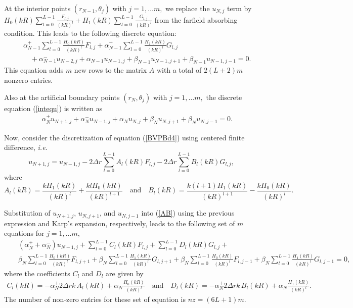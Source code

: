 \documentclass[final,3p,times,12pt]{elsarticle}
\begin{document}
At the interior points $(r_{N-1},\theta_j)$ with $j=1,\dots m,$ we replace the 
$u_{N,j}$ term by $H_0(kR) \sum_{l=0}^{L-1} \frac{F_{l,j}}{(kR)^l} + H_1(kR)\sum_{l=0}^{L-1} \frac{G_{l,j}}{(kR)^l}$ from the farfield absorbing condition.  This leads to the following discrete equation:
\begin{eqnarray}
&&\alpha_{N-1}^{+}\sum_{l=0}^{L-1}\frac{H_0(kR)}{(kR)^l}  F_{l,j} + \alpha_{N-1}^{+}\sum_{l=0}^{L-1}\frac{H_1(kR)}{(kR)^l}  G_{l,j}\nonumber\\
 &&\quad+ \alpha_{N-1}^{-}u_{N-2,j} + \alpha_{N-1}u_{N-1,j}+ \beta_{N-1}u_{N-1,j+1} + \beta_{N-1}u_{N-1,j-1}=0.\label{interioreq}
\end{eqnarray}
This equation adds $ m$ new rows to the matrix $A$ with a total of $2(L+2)m$ nonzero entries.

Also at the artificial boundary points $(r_{N},\theta_j)$ with $j=1,\dots m,$ the discrete equation  (\ref{intequ}) is written as
 \begin{eqnarray}
&&\alpha_N^{+} u_{N+1,j}+ \alpha_N^{-} u_{N-1,j} + \alpha_N u_{N,j}+ \beta_{N} u_{N,j+1}+ \beta_N u_{N,j-1} =0.
\label{AB}
\end{eqnarray}

Now, consider the discretization of equation (\ref{BVPBd4}) using centered finite difference, {\it i.e.}
\begin{equation}
u_{N+1,j} = u_{N-1,j}  
-2\Delta r \sum_{l=0}^{L-1}A_l(kR)F_{l,j} - 
2\Delta r \sum_{l=0}^{L-1}B_l(kR)G_{l,j}, \label{1deriv}
\end{equation}
where 
\begin{equation}
A_l(kR)=\frac{kH_1(kR)}{(kR)^l} + \frac{klH_0(kR)}{(kR)^{l+1}}\quad\mbox{and}\quad 
B_l(kR)=\frac{k(l+1)H_1(kR)}{(kR)^{l+1}} - \frac{kH_0(kR)}{(kR)^{l}}. \nonumber
\end{equation}

Substitution of $u_{N+1,j}$, $u_{N,j+1}$, and $u_{N,j-1}$ into (\ref{AB}) using the previous expression and Karp's expansion, respectively, leads to the following set of $m$ equations for $j=1,\dots m$,
\begin{eqnarray}
&&(\alpha_N^{+} +\alpha_N^{-} )u_{N-1,j}  + \sum_{l=0}^{L-1}C_l(kR) F_{l,j} +\sum_{l=0}^{L-1}D_l(kR) G_{l,j}+ \label{uneq}\\
&&\beta_{N}\sum_{l=0}^{L-1}\frac{H_0(kR)}{(kR)^l}  F_{l,j+1} + \beta_{N}\sum_{l=0}^{L-1}\frac{H_1(kR)}{(kR)^l}  G_{l,j+1}
+ \beta_{N}\sum_{l=0}^{L-1}\frac{H_0(kR)}{(kR)^l}  F_{l,j-1} + \beta_{N}\sum_{l=0}^{L-1}\frac{H_1(kR)}{(kR)^l}  G_{l,j-1}=0,
\nonumber
\end{eqnarray}
where the coefficients $C_l$ and $D_l$ are given by
\begin{eqnarray}
C_l(kR) =  -\alpha_N^{+}2\Delta r k \,A_l(kR)
 + \alpha_N \frac{H_0(kR)}{(kR)^l} \quad \mbox{and}\quad
D_l(kR) =  -\alpha_N^{+} 2\Delta r k \,B_l(kR) + \alpha_N \frac{H_1(kR)}{(kR)^l}.\nonumber
\end{eqnarray}
The number of non-zero entries for these set of equation is $nz = (6L+1)m$.
\end{document}
